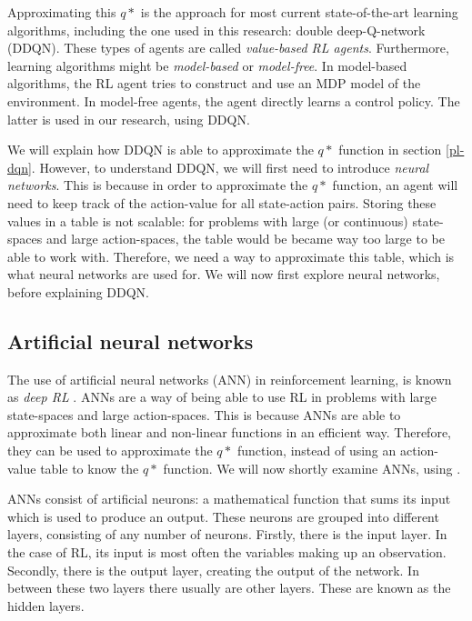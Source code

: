 Approximating this $q*$ is the approach for most current state-of-the-art learning algorithms, including the one used in this research: double deep-Q-network (DDQN). These types of agents are called \emph{value-based RL agents}. Furthermore, learning algorithms might be \emph{model-based} or \emph{model-free}. In model-based algorithms, the RL agent tries to construct and use an MDP model of the environment. In  model-free agents, the agent directly learns a control policy. The latter is used in our research, using DDQN.

We will explain how DDQN is able to approximate the $q*$ function in section \ref{pl-dqn}. However, to understand DDQN, we will first need to introduce \emph{neural networks}. This is because in order to approximate the $q*$ function, an agent will need to keep track of the action-value for all state-action pairs. Storing these values in a table is not scalable: for problems with large (or continuous) state-spaces and large action-spaces, the table would be became way too large to be able to work with. Therefore, we need a way to approximate this table, which is what neural networks are used for. We will now first explore neural networks, before explaining DDQN.

\subsection{Artificial neural networks}\label{pl-nn}
The use of artificial neural networks (ANN) in reinforcement learning, is known as \emph{deep RL} \cite[p. 5]{grokking}. ANNs are a way of being able to use RL in problems with large state-spaces and large action-spaces. This is because ANNs are able to approximate both linear and non-linear functions in an efficient way\cite[p. 165-166]{nn}. Therefore, they can be used to approximate the $q*$ function, instead of using an action-value table to know the $q*$ function. We will now shortly examine ANNs, using \cite[p. 164-366]{nn}.

ANNs consist of artificial neurons: a mathematical function that sums its input which is used to produce an output. These neurons are grouped into different layers, consisting of any number of neurons. Firstly, there is the input layer. In the case of RL, its input is most often the variables making up an observation. Secondly, there is the output layer, creating the output of the network. In between these two layers there usually are other layers. These are known as the hidden layers. 

